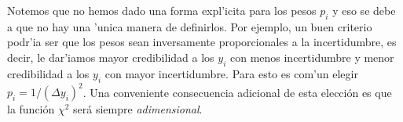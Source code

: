 \documentclass[letterpaper,11pt]{report}
\begin{document}

Notemos que no hemos dado una forma expl'icita para los pesos $p_i$ y eso se debe a que no hay una 'unica manera de definirlos. Por ejemplo, un buen criterio podr'ia ser que los pesos sean inversamente proporcionales a la incertidumbre, es decir, le dar'iamos mayor credibilidad a los $y_{i}$ con menos incertidumbre y menor credibilidad a los $y_{i}$ con mayor incertidumbre. Para esto es com'un elegir $p_i=1/(\Delta y_{i})^2$. Una conveniente consecuencia adicional de esta elección es que la función $\chi^2$ será siempre \textit{adimensional}.
\end{document}
